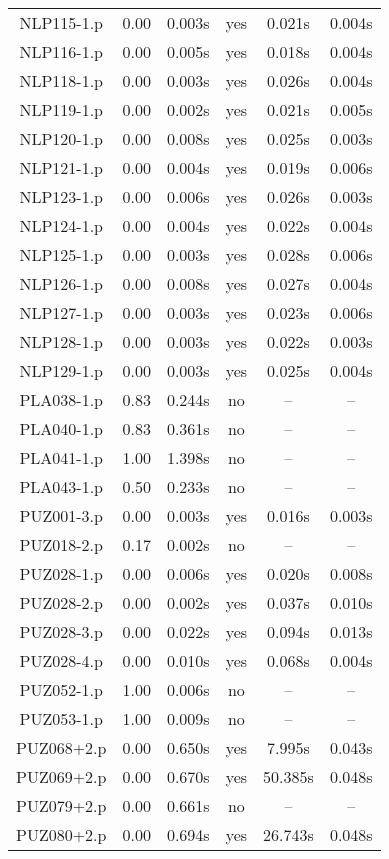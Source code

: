 \begin{center}
\begin{longtable}{||c | c | c | c | c | c||}
NLP115-1.p & 0.00 & 0.003s & yes & 0.021s & 0.004s \\
NLP116-1.p & 0.00 & 0.005s & yes & 0.018s & 0.004s \\
NLP118-1.p & 0.00 & 0.003s & yes & 0.026s & 0.004s \\
NLP119-1.p & 0.00 & 0.002s & yes & 0.021s & 0.005s \\
NLP120-1.p & 0.00 & 0.008s & yes & 0.025s & 0.003s \\
NLP121-1.p & 0.00 & 0.004s & yes & 0.019s & 0.006s \\
NLP123-1.p & 0.00 & 0.006s & yes & 0.026s & 0.003s \\
NLP124-1.p & 0.00 & 0.004s & yes & 0.022s & 0.004s \\
NLP125-1.p & 0.00 & 0.003s & yes & 0.028s & 0.006s \\
NLP126-1.p & 0.00 & 0.008s & yes & 0.027s & 0.004s \\
NLP127-1.p & 0.00 & 0.003s & yes & 0.023s & 0.006s \\
NLP128-1.p & 0.00 & 0.003s & yes & 0.022s & 0.003s \\
NLP129-1.p & 0.00 & 0.003s & yes & 0.025s & 0.004s \\
PLA038-1.p & 0.83 & 0.244s & no & -- & -- \\
PLA040-1.p & 0.83 & 0.361s & no & -- & -- \\
PLA041-1.p & 1.00 & 1.398s & no & -- & -- \\
PLA043-1.p & 0.50 & 0.233s & no & -- & -- \\
PUZ001-3.p & 0.00 & 0.003s & yes & 0.016s & 0.003s \\
PUZ018-2.p & 0.17 & 0.002s & no & -- & -- \\
PUZ028-1.p & 0.00 & 0.006s & yes & 0.020s & 0.008s \\
PUZ028-2.p & 0.00 & 0.002s & yes & 0.037s & 0.010s \\
PUZ028-3.p & 0.00 & 0.022s & yes & 0.094s & 0.013s \\
PUZ028-4.p & 0.00 & 0.010s & yes & 0.068s & 0.004s \\
PUZ052-1.p & 1.00 & 0.006s & no & -- & -- \\
PUZ053-1.p & 1.00 & 0.009s & no & -- & -- \\
PUZ068+2.p & 0.00 & 0.650s & yes & 7.995s & 0.043s \\
PUZ069+2.p & 0.00 & 0.670s & yes & 50.385s & 0.048s \\
PUZ079+2.p & 0.00 & 0.661s & no & -- & -- \\
PUZ080+2.p & 0.00 & 0.694s & yes & 26.743s & 0.048s \\

\end{longtable}
\end{center}
